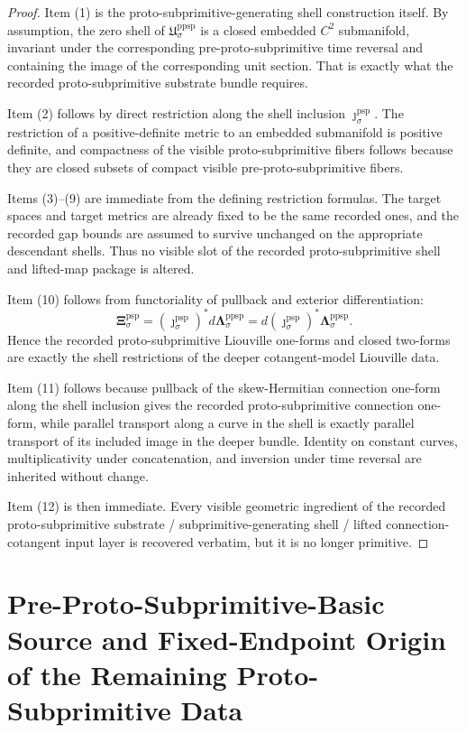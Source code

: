 \documentclass[11pt]{article}
\newcommand{\ProtoSubprimInc}[1]{\jmath_{#1}^{\mathrm{psp}}}
\newcommand{\ProtoSubprimTwo}[1]{\boldsymbol{\Xi}_{#1}^{\mathrm{psp}}}
\newcommand{\PreProtoSubprimSection}[1]{\mathfrak U_{#1}^{\mathrm{ppsp}}}
\newcommand{\PreProtoSubprimLiouville}[1]{\boldsymbol{\Lambda}_{#1}^{\mathrm{ppsp}}}
\begin{document}
\begin{proof}
Item (1) is the proto-subprimitive-generating shell construction itself. By assumption, the zero shell of \(\PreProtoSubprimSection{\sigma}\) is a closed embedded \(C^2\) submanifold, invariant under the corresponding pre-proto-subprimitive time reversal and containing the image of the corresponding unit section. That is exactly what the recorded proto-subprimitive substrate bundle requires.

Item (2) follows by direct restriction along the shell inclusion \(\ProtoSubprimInc{\sigma}\). The restriction of a positive-definite metric to an embedded submanifold is positive definite, and compactness of the visible proto-subprimitive fibers follows because they are closed subsets of compact visible pre-proto-subprimitive fibers.

Items (3)--(9) are immediate from the defining restriction formulas. The target spaces and target metrics are already fixed to be the same recorded ones, and the recorded gap bounds are assumed to survive unchanged on the appropriate descendant shells. Thus no visible slot of the recorded proto-subprimitive shell and lifted-map package is altered.

Item (10) follows from functoriality of pullback and exterior differentiation:
\[
\ProtoSubprimTwo{\sigma}
=
(\ProtoSubprimInc{\sigma})^*d\PreProtoSubprimLiouville{\sigma}
=
d(\ProtoSubprimInc{\sigma})^*\PreProtoSubprimLiouville{\sigma}.
\]
Hence the recorded proto-subprimitive Liouville one-forms and closed two-forms are exactly the shell restrictions of the deeper cotangent-model Liouville data.

Item (11) follows because pullback of the skew-Hermitian connection one-form along the shell inclusion gives the recorded proto-subprimitive connection one-form, while parallel transport along a curve in the shell is exactly parallel transport of its included image in the deeper bundle. Identity on constant curves, multiplicativity under concatenation, and inversion under time reversal are inherited without change.

Item (12) is then immediate. Every visible geometric ingredient of the recorded proto-subprimitive substrate / subprimitive-generating shell / lifted connection-cotangent input layer is recovered verbatim, but it is no longer primitive.
\end{proof}

\section{Pre-Proto-Subprimitive-Basic Source and Fixed-Endpoint Origin of the Remaining Proto-Subprimitive Data}
\end{document}
